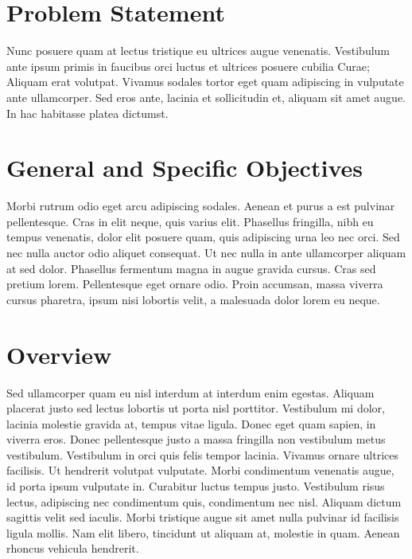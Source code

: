 \section{Problem Statement}

Nunc posuere quam at lectus tristique eu ultrices augue venenatis. Vestibulum ante ipsum primis in faucibus orci luctus et ultrices posuere cubilia Curae; Aliquam erat volutpat. Vivamus sodales tortor eget quam adipiscing in vulputate ante ullamcorper. Sed eros ante, lacinia et sollicitudin et, aliquam sit amet augue. In hac habitasse platea dictumst.


\section{General and Specific Objectives}
Morbi rutrum odio eget arcu adipiscing sodales. Aenean et purus a est pulvinar pellentesque. Cras in elit neque, quis varius elit. Phasellus fringilla, nibh eu tempus venenatis, dolor elit posuere quam, quis adipiscing urna leo nec orci. Sed nec nulla auctor odio aliquet consequat. Ut nec nulla in ante ullamcorper aliquam at sed dolor. Phasellus fermentum magna in augue gravida cursus. Cras sed pretium lorem. Pellentesque eget ornare odio. Proin accumsan, massa viverra cursus pharetra, ipsum nisi lobortis velit, a malesuada dolor lorem eu neque.


\section{Overview}

Sed ullamcorper quam eu nisl interdum at interdum enim egestas. Aliquam placerat justo sed lectus lobortis ut porta nisl porttitor. Vestibulum mi dolor, lacinia molestie gravida at, tempus vitae ligula. Donec eget quam sapien, in viverra eros. Donec pellentesque justo a massa fringilla non vestibulum metus vestibulum. Vestibulum in orci quis felis tempor lacinia. Vivamus ornare ultrices facilisis. Ut hendrerit volutpat vulputate. Morbi condimentum venenatis augue, id porta ipsum vulputate in. Curabitur luctus tempus justo. Vestibulum risus lectus, adipiscing nec condimentum quis, condimentum nec nisl. Aliquam dictum sagittis velit sed iaculis. Morbi tristique augue sit amet nulla pulvinar id facilisis ligula mollis. Nam elit libero, tincidunt ut aliquam at, molestie in quam. Aenean rhoncus vehicula hendrerit.

